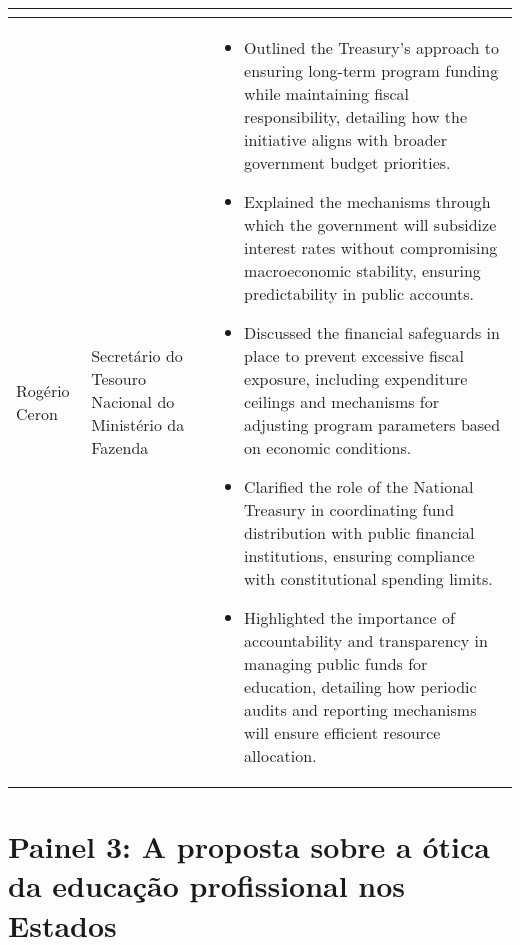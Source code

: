 \documentclass[a4paper,10pt]{article}
\begin{document}
\begin{table}[htbp!]
\begin{tabular}{|p{1in}|p{1.4in}|p{4.2in}|}
\begin{itemize}
		\end{itemize}\\
		\hline
		Rogério Ceron & Secretário do Tesouro Nacional do Ministério da Fazenda & \begin{itemize}
			\item Outlined the Treasury’s approach to ensuring long-term program funding while maintaining fiscal responsibility, detailing how the initiative aligns with broader government budget priorities.
			\item Explained the mechanisms through which the government will subsidize interest rates without compromising macroeconomic stability, ensuring predictability in public accounts.
			\item Discussed the financial safeguards in place to prevent excessive fiscal exposure, including expenditure ceilings and mechanisms for adjusting program parameters based on economic conditions.
			\item Clarified the role of the National Treasury in coordinating fund distribution with public financial institutions, ensuring compliance with constitutional spending limits.
			\item Highlighted the importance of accountability and transparency in managing public funds for education, detailing how periodic audits and reporting mechanisms will ensure efficient resource allocation.
		\end{itemize}\\
		\hline
	\end{tabular}
\end{table}

\newpage

\section*{Painel 3: A proposta sobre a ótica da educação profissional nos Estados}
\end{document}

